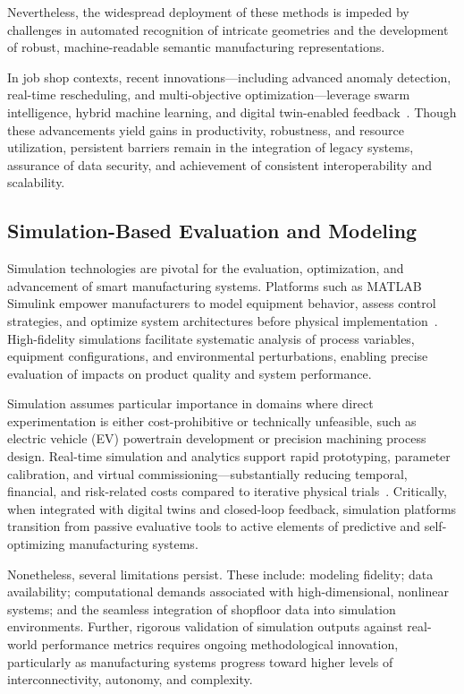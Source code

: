 \documentclass[sigconf]{acmart}
\begin{document}
Nevertheless, the widespread deployment of these methods is impeded by challenges in automated recognition of intricate geometries and the development of robust, machine-readable semantic manufacturing representations.

In job shop contexts, recent innovations—including advanced anomaly detection, real-time rescheduling, and multi-objective optimization—leverage swarm intelligence, hybrid machine learning, and digital twin-enabled feedback~\cite{ref19,ref27,ref38,ref44}. Though these advancements yield gains in productivity, robustness, and resource utilization, persistent barriers remain in the integration of legacy systems, assurance of data security, and achievement of consistent interoperability and scalability.

\subsection{Simulation-Based Evaluation and Modeling}

Simulation technologies are pivotal for the evaluation, optimization, and advancement of smart manufacturing systems. Platforms such as MATLAB Simulink empower manufacturers to model equipment behavior, assess control strategies, and optimize system architectures before physical implementation~\cite{ref95}. High-fidelity simulations facilitate systematic analysis of process variables, equipment configurations, and environmental perturbations, enabling precise evaluation of impacts on product quality and system performance.

Simulation assumes particular importance in domains where direct experimentation is either cost-prohibitive or technically unfeasible, such as electric vehicle (EV) powertrain development or precision machining process design. Real-time simulation and analytics support rapid prototyping, parameter calibration, and virtual commissioning—substantially reducing temporal, financial, and risk-related costs compared to iterative physical trials~\cite{ref95}. Critically, when integrated with digital twins and closed-loop feedback, simulation platforms transition from passive evaluative tools to active elements of predictive and self-optimizing manufacturing systems.

Nonetheless, several limitations persist. These include: modeling fidelity; data availability; computational demands associated with high-dimensional, nonlinear systems; and the seamless integration of shopfloor data into simulation environments. Further, rigorous validation of simulation outputs against real-world performance metrics requires ongoing methodological innovation, particularly as manufacturing systems progress toward higher levels of interconnectivity, autonomy, and complexity.
\end{document}
